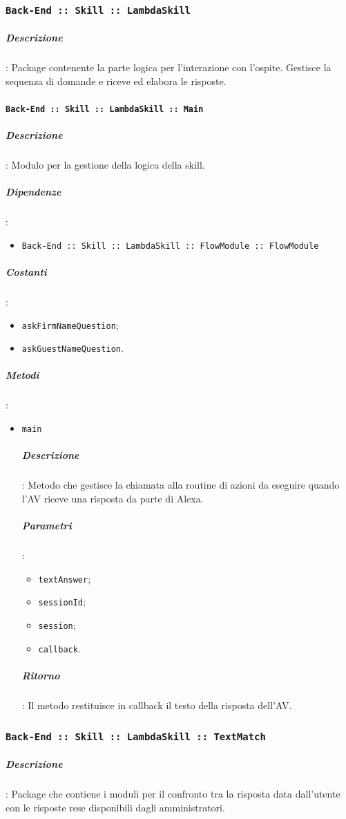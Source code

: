 \documentclass[../DefinizioneDiProdotto_v3.0.0.tex]{subfiles}
\begin{document}
\subsubsection{\texttt{Back-End :: Skill :: LambdaSkill}}
\subparagraph{Descrizione}: Package contenente la parte logica per l'interazione con l'ospite. Gestisce la sequenza di domande e riceve ed elabora le risposte.

\paragraph{\texttt{Back-End :: Skill :: LambdaSkill :: Main}}
\subparagraph{Descrizione}: Modulo per la gestione della logica della skill.
\subparagraph{Dipendenze}:
\begin{itemize}
	\item \texttt{Back-End :: Skill :: LambdaSkill :: FlowModule :: FlowModule}
\end{itemize}
\subparagraph{Costanti}:
\begin{itemize}
	\item \texttt{askFirmNameQuestion};
	\item \texttt{askGuestNameQuestion}.
\end{itemize}
\subparagraph{Metodi}:
\begin{itemize}
	\item \texttt{main}
	      \subparagraph{Descrizione}: Metodo che gestisce la chiamata alla routine di azioni da eseguire quando l'AV riceve una risposta da parte di Alexa.
	      \subparagraph{Parametri}:
	      \begin{itemize}
	      	\item \texttt{textAnswer};
	      	\item \texttt{sessionId};
	      	\item \texttt{session};
	      	\item \texttt{callback}.
	      \end{itemize}
	      \subparagraph{Ritorno}: Il metodo restituisce in callback il testo della risposta dell'AV.
\end{itemize}

\subsubsection{\texttt{Back-End :: Skill :: LambdaSkill :: TextMatch}}
\subparagraph{Descrizione}: Package che contiene i moduli per il confronto tra la risposta data dall'utente con le risposte rese disponibili dagli amministratori.
\end{document}
